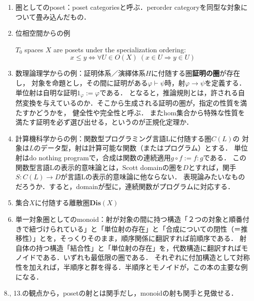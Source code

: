 \documentclass[uplatex, 12pt, dvipdfmx]{jsarticle}
\begin{document}
\begin{enumerate}
\begin{proof}
        この時，集合$P$について，次のように約束する．
        \[ x\le y\land y\le x\Rightarrow x=y \]
        すると集合$P/=$は順序集合(partially ordered set)である．
        関手$F':C\to P/=$は厳密な意味では可逆ではない．
    \end{proof}
    \begin{remark}
        細い圏は全てposetと同型である，としなかったのがむしろ圏論特有の自由度の高さ，表現力の豊かさとなっている．
    \end{remark}
    \item 圏としてのposet：poset categoriesと呼ぶ．perorder categoryを同型な対象について畳み込んだもの．
    \item 位相空間からの例
    \begin{proposition*}
        $T_0$ spaces $X$ are posets under the specialization ordering:
        \[ x\le y \Leftrightarrow \forall U\in O(X)\; (x\in U\Rightarrow y\in U) \]
    \end{proposition*}
    \item 数理論理学からの例：証明体系／演繹体系$H$に付随する圏\textbf{証明の圏}が存在し，
    対象を命題とし，その間に証明がある$\varphi\vdash\psi$時，射$\varphi\to\psi$を定義する．
    単位射は自明な証明$1_\varphi:=\varphi$である．
    となると，推論規則とは，許される自然変換を与えているのか．そこから生成される証明の圏が，指定の性質を満たすかどうかを，
    健全性や完全性と呼ぶ．
    またhom集合から特殊な性質を満たす証明を必ず選び出せる，というのが正規化定理か．
    \item 計算機科学からの例：関数型プログラミング言語Lに付随する圏$C(L)$の
    対象は$L$のデータ型，射は計算可能な関数（またはプログラム）とする．
    単位射はdo nothing programで，合成は関数の連続適用$g\circ f:=f:g$である．
    この関数型言語Lの表示的意味論とは，Scott domainの圏を$D$とすれば，関手$S:C(L)\to D$が言語Lの表示的意味論に他ならない．
    表現論みたいなものだろうか．すると，domainが型に，連続関数がプログラムに対応する．
    \item 集合$X$に付随する離散圏$\mathbf{Dis}(X)$
    \item 単一対象圏としてのmonoid：射が対象の間に持つ構造「２つの対象と順番付きで紐づけられている」と「単位射の存在」と「合成についての閉性（＝推移性）」とを，そっくりそのまま，順序関係に翻訳すれば前順序である．
    射自体の持つ構造「結合性」と「単位射の存在」を，代数構造に翻訳すればモノイドである．いずれも最低限の圏である．
    それぞれに付加構造として対称性を加えれば，半順序と群を得る．半順序とモノイドが，この本の主要な例になる．
\end{enumerate}
8., 13.の観点から，posetの射とは関手だし，monoidの射も関手と見做せる．
\end{document}
